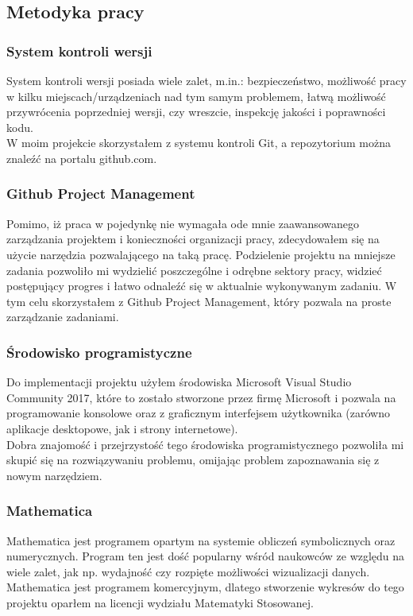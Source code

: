 \documentclass[twoside]{projektInzynierskiMS1}
\newcommand{\si}{ś}
\begin{document}
	\subsection{Metodyka pracy}
	\subsubsection{System kontroli wersji}
	System kontroli wersji posiada wiele zalet, m.in.: bezpieczeństwo, możliwo\si ć pracy w kilku miejscach/urządzeniach nad tym samym problemem, łatwą możliwo\si ć przywrócenia poprzedniej wersji, czy wreszcie, inspekcję jako\si ci i poprawno\si ci kodu. \\
W moim projekcie skorzystałem z systemu kontroli Git, a repozytorium można znaleźć na portalu github.com. 
	\subsubsection{Github Project Management}
Pomimo, iż praca w pojedynkę nie wymagała ode mnie zaawansowanego zarządzania projektem i konieczno\si ci organizacji pracy, zdecydowałem się na użycie narzędzia pozwalającego na taką pracę. Podzielenie projektu na mniejsze zadania pozwoliło mi wydzielić poszczególne i odrębne sektory pracy, widzieć postępujący progres i łatwo odnaleźć się w aktualnie wykonywanym zadaniu. W tym celu skorzystałem z Github Project Management, który pozwala na proste zarządzanie zadaniami.
	\subsubsection{Środowisko programistyczne}
Do implementacji projektu użyłem \si rodowiska Microsoft Visual Studio Community 2017, które to zostało stworzone przez firmę Microsoft i pozwala na programowanie konsolowe oraz z graficznym interfejsem użytkownika (zarówno aplikacje desktopowe, jak i strony internetowe).  \\
Dobra znajomo\si ć i przejrzysto\si ć tego \si rodowiska programistycznego pozwoliła mi skupić się na rozwiązywaniu problemu, omijając problem zapoznawania się z nowym narzędziem.
	\subsubsection{Mathematica}
	Mathematica jest programem opartym na systemie obliczeń symbolicznych oraz numerycznych. Program ten jest do\si ć popularny w\si ród naukowców ze względu na wiele zalet, jak np. wydajno\si ć czy rozpięte możliwo\si ci wizualizacji danych. Mathematica jest programem komercyjnym, dlatego stworzenie wykresów do tego projektu oparłem na licencji wydziału Matematyki Stosowanej.
\end{document}

